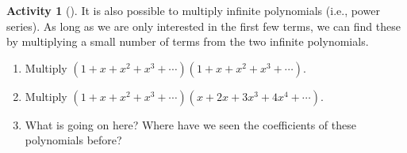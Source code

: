 \documentclass[10pt,]{book}
\theoremstyle{plain}
\theoremstyle{definition}
\theoremstyle{definition}
\theoremstyle{definition}
\newtheorem{activity}[project]{Activity}
\numberwithin{equation}{chapter}
\begin{document}
\begin{activity}[]\label{activity-228}
\hypertarget{p-1248}{}%
It is also possible to multiply infinite polynomials (i.e., power series).  As long as we are only interested in the first few terms, we can find these by multiplying a small number of terms from the two infinite polynomials.%
\begin{enumerate}[font=\bfseries,label=(\alph*),ref=\alph*]
\item\label{task-239} \hypertarget{p-1249}{}%
Multiply \((1+x+x^2+x^3 + \cdots)(1+ x + x^2 + x^3+ \cdots)\).%
\item\label{task-240} \hypertarget{p-1250}{}%
Multiply \((1+x+x^2 + x^3 + \cdots)(x + 2x + 3x^3 + 4x^4 + \cdots)\).%
\item\label{task-241} \hypertarget{p-1251}{}%
What is going on here?  Where have we seen the coefficients of these polynomials before?%
\end{enumerate}
\end{activity}
\typeout{************************************************}
\typeout{************************************************}
\end{document}
